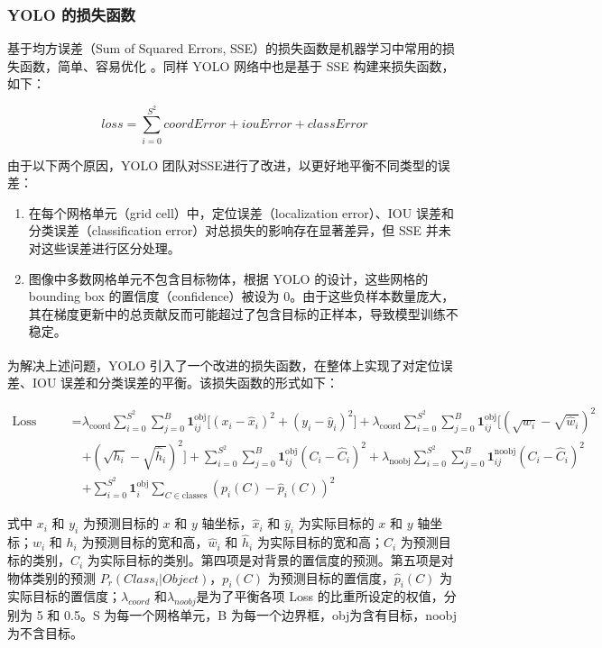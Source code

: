 \subsubsection{YOLO 的损失函数}

基于均方误差（Sum of Squared Errors, SSE）的损失函数是机器学习中常用的损失函数，简单、容易优化 。同样 YOLO 网络中也是基于 SSE 构建来损失函数，如下：

\begin{equation}
loss = \sum_{i=0}^{S^2} coordError + iouError + classError
\end{equation}

由于以下两个原因，YOLO 团队对SSE进行了改进，以更好地平衡不同类型的误差：

\begin{enumerate}
  \item 在每个网格单元（grid cell）中，定位误差（localization error）、IOU 误差和分类误差（classification error）对总损失的影响存在显著差异，但 SSE 并未对这些误差进行区分处理。
  
  \item 图像中多数网格单元不包含目标物体，根据 YOLO 的设计，这些网格的 bounding box 的置信度（confidence）被设为 0。由于这些负样本数量庞大，其在梯度更新中的总贡献反而可能超过了包含目标的正样本，导致模型训练不稳定。
\end{enumerate}

为解决上述问题，YOLO 引入了一个改进的损失函数\textsuperscript{\cite{DZYX202210040}}，在整体上实现了对定位误差、IOU 误差和分类误差的平衡。该损失函数的形式如下：

\begin{align}
\text{Loss Function} = & \lambda_{\text{coord}} \sum_{i=0}^{S^2} \sum_{j=0}^{B} \mathbf{1}_{ij}^{\text{obj}} \big[ (x_i - \hat{x}_i)^2 + (y_i - \hat{y}_i)^2 \big] \nonumber 
 + \lambda_{\text{coord}} \sum_{i=0}^{S^2} \sum_{j=0}^{B} \mathbf{1}_{ij}^{\text{obj}} \big[ (\sqrt{w_i} - \sqrt{\hat{w}_i})^2 \\
 &+ (\sqrt{h_i} - \sqrt{\hat{h}_i})^2 \big] \nonumber 
  + \sum_{i=0}^{S^2} \sum_{j=0}^{B} \mathbf{1}_{ij}^{\text{obj}} (C_i - \hat{C}_i)^2 \nonumber 
   + \lambda_{\text{noobj}} \sum_{i=0}^{S^2} \sum_{j=0}^{B} \mathbf{1}_{ij}^{\text{noobj}} (C_i - \hat{C}_i)^2 \nonumber \\
  &+ \sum_{i=0}^{S^2} \mathbf{1}_{i}^{\text{obj}} \sum_{C \in \text{classes}} (p_i(C) - \hat{p}_i(C))^2
\end{align}


式中 $x_i$ 和 $y_i$ 为预测目标的 $x$ 和 $y$ 轴坐标，$\hat{x}_i$ 和 $\hat{y}_i$ 为实际目标的 $x$ 和 $y$ 轴坐标；$w_i$ 和 $h_i$ 为预测目标的宽和高，$\hat{w}_i$ 和 $\hat{h}_i$ 为实际目标的宽和高；$C_i$ 为预测目标的类别，$\hat{C}_i$ 为实际目标的类别。第四项是对背景的置信度的预测。第五项是对物体类别的预测 $P_r(Class_i|Object)$，$p_i(C)$ 为预测目标的置信度，$\hat{p}_i(C)$ 为实际目标的置信度；$\lambda_{coord}$ 和$\lambda_{noobj}$是为了平衡各项 Loss 的比重所设定的权值，分别为 5 和 0.5。S 为每一个网格单元，B 为每一个边界框，obj为含有目标，noobj 为不含目标。

